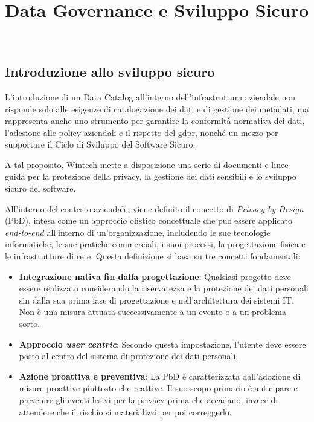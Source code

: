 \chapter{Data Governance e Sviluppo Sicuro}
\label{cap:sviluppo-sicuro}

\\

\section{Introduzione allo sviluppo sicuro}
L'introduzione di un Data Catalog all'interno dell'infrastruttura aziendale non risponde solo alle esigenze di catalogazione dei dati e di gestione dei metadati, 
ma rappresenta anche uno strumento per garantire la conformità normativa dei dati, l'adesione alle policy aziendali e il rispetto del \gls{gdpr}, nonché un mezzo per supportare il Ciclo di Sviluppo del Software Sicuro.

A tal proposito, Wintech mette a disposizione una serie di documenti e linee guida per la protezione della privacy, la gestione dei dati sensibili e lo sviluppo sicuro del software.

All'interno del contesto aziendale, viene definito il concetto di \emph{Privacy by Design} (PbD), intesa come un approccio olistico concettuale che può essere applicato \emph{end-to-end} all'interno di un'organizzazione, 
includendo le sue tecnologie informatiche, le sue pratiche commerciali, i suoi processi, la progettazione fisica e le infrastrutture di rete. 
Questa definizione si basa su tre concetti fondamentali:
\begin{itemize}
    \item \textbf{Integrazione nativa fin dalla progettazione}: Qualsiasi progetto deve essere realizzato considerando la riservatezza e la protezione dei dati personali sin dalla sua prima fase di progettazione e nell'architettura dei sistemi IT. Non è una misura attuata successivamente a un evento o a un problema sorto.
    \item \textbf{Approccio \emph{user centric}}: Secondo questa impostazione, l'utente deve essere posto al centro del sistema di protezione dei dati personali.
    \item \textbf{Azione proattiva e preventiva}: La PbD è caratterizzata dall'adozione di misure proattive piuttosto che reattive. Il suo scopo primario è anticipare e prevenire gli eventi lesivi per la privacy prima che accadano, invece di attendere che il rischio si materializzi per poi correggerlo.
\end{itemize}


